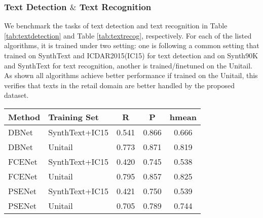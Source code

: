 \documentclass[runningheads]{llncs}
\begin{document}
\subsubsection{Text Detection $\&$ Text Recognition} We benchmark the tasks of text detection and text recognition in Table \ref{tab:textdetection} and Table \ref{tab:textrecog}, respectively. For each of the listed algorithms, it is trained under two setting: one is following a common setting that trained on SynthText\cite{SynthText} and ICDAR2015(IC15)\cite{ICDAR15} for text detection and on Synth90K\cite{Synth90k} and SynthText for text recognition, another is trained/finetuned on the Unitail. As shown all algorithms achieve better performance if trained on the Unitail, this verifies that texts in the retail domain are better handled by the proposed dataset. 

\begin{SCtable}[]
\centering
\setlength\tabcolsep{3pt}
\caption{Benchmarking text detection on Unitail. P and R stand for Precision and Recall, respectively. hmean is the harmonic mean of precision and recall. }
\begin{tabular}{l|l|ccc}
\hline \hline
Method         & Training Set        & R       & P       & hmean    \\ \hline
DBNet\cite{DBNet2020}          & SynthText+IC15      & 0.541   & 0.866   & 0.666    \\
DBNet          & Unitail             & 0.773   & 0.871   & 0.819    \\
FCENet\cite{FCENet2021}         & SynthText+IC15      & 0.420   & 0.745   & 0.538    \\
FCENet         & Unitail             & 0.795   & 0.857   & 0.825    \\
PSENet\cite{PSENet2019}         & SynthText+IC15      & 0.421   & 0.750   & 0.539    \\
PSENet         & Unitail             & 0.705   & 0.789   & 0.744    \\
\hline
\end{tabular}
\label{tab:textdetection}
\end{SCtable}
\end{document}
